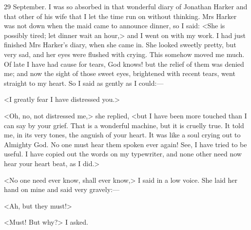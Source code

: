 \begin{diary}{29 September.}
I was so absorbed in that wonderful diary of Jonathan Harker and that other of his wife that I let the time run on without thinking. Mrs Harker was not down when the maid came to announce dinner, so I said: <She is possibly tired; let dinner wait an hour,> and I went on with my work. I had just finished Mrs Harker's diary, when she came in. She looked sweetly pretty, but very sad, and her eyes were flushed with crying. This somehow moved me much. Of late I have had cause for tears, God knows! but the relief of them was denied me; and now the sight of those sweet eyes, brightened with recent tears, went straight to my heart. So I said as gently as I could:—

<I greatly fear I have distressed you.>

<Oh, no, not distressed me,> she replied, <but I have been more touched than I can say by your grief. That is a wonderful machine, but it is cruelly true. It told me, in its very tones, the anguish of your heart. It was like a soul crying out to Almighty God. No one must hear them spoken ever again! See, I have tried to be useful. I have copied out the words on my typewriter, and none other need now hear your heart beat, as I did.>

<No one need ever know, shall ever know,> I said in a low voice. She laid her hand on mine and said very gravely:—

<Ah, but they must!>

<Must! But why?> I asked.


\end{diary}
